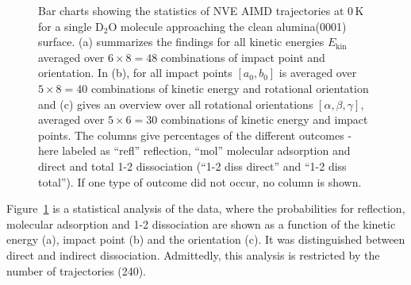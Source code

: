 \documentclass[11pt,DIV=13,BCOR=5mm,a4paper,headinclude]{scrbook}
\begin{document}
  \begin{figure}[h!]
\centering
 \quad
 \quad
\caption{Bar charts showing the statistics of NVE AIMD trajectories at $0\,$K for a single D$_2$O molecule approaching the clean alumina(0001) surface.
(a) summarizes the findings for all kinetic energies $E_\textrm{kin}$ averaged over $6\times 8=48$ combinations of impact point and orientation.
In (b), for all impact points $[a_0,b_0]$ is averaged over $5 \times 8=40$ combinations of kinetic energy and rotational orientation and (c) gives an overview over all rotational orientations $[\alpha,\beta,\gamma]$, averaged over $5 \times 6=30$ combinations of kinetic energy and impact points.
The columns give percentages of the different outcomes - here labeled as ``refl'' reflection, ``mol'' molecular adsorption and direct and total 1-2 dissociation (``1-2 diss direct'' and  ``1-2 diss total'').
If one type of outcome did not occur, no column is shown.}
\label{abb:barchart_mic}
\end{figure}
Figure~\ref{abb:barchart_mic} is a statistical analysis of the data, where the probabilities for reflection, molecular adsorption and 1-2 dissociation are shown as a function of the kinetic energy (a), impact point (b) and the orientation (c).
It was distinguished between direct and indirect dissociation.
Admittedly, this analysis is restricted by the number of trajectories (240).
\end{document}
